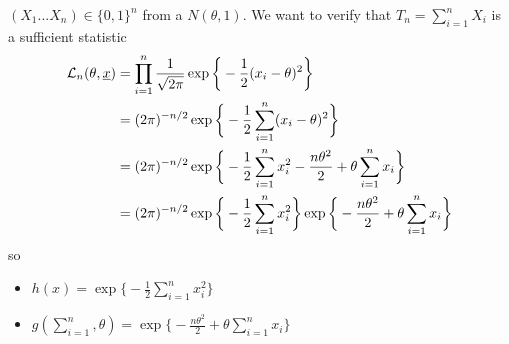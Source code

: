 \begin{eg}\label{eg:gauss}
		$(X_1... X_n)\in \{0,1\}^n$ from a $N(\theta,1)$. We want to verify that $T_n=\sum_{i=1}^{n} X_i$ is a sufficient statistic
		\[
		\begin{split}
			\mathcal{L}_n(\theta,\underline x)
			&=\prod_{i=1}^{n}\frac{1}{\sqrt{2 \pi}} \exp \bigg\{ -\frac{1}{2} (x_i-\theta)^2 \bigg\}\\
			&=(2\pi)^{-n/2}\exp \bigg\{ -\frac{1}{2} \sum_{i=1}^{n}(x_i-\theta)^2 \bigg\}\\
			&=(2\pi)^{-n/2}\exp \bigg\{ -\frac{1}{2} \sum_{i=1}^{n}x_i^2- \frac{n\theta^2}{2}+\theta\sum_{i=1}^{n} x_i \bigg\}\\
			&=(2\pi)^{-n/2}\exp \bigg\{ -\frac{1}{2} \sum_{i=1}^{n}x_i^2 \bigg\} \exp \bigg\{- \frac{n\theta^2}{2}+\theta\sum_{i=1}^{n} x_i \bigg\}
		\end{split}
		\]
		so
		\begin{itemize}
			\item $h(x)=\exp \bigg\{ -\frac{1}{2} \sum_{i=1}^{n}x_i^2 \bigg\}$
			\item $g(\sum_{i=1}^n,\theta) = \exp \bigg\{- \frac{n\theta^2}{2}+\theta\sum_{i=1}^{n} x_i \bigg\}$
		\end{itemize}
\end{eg}

